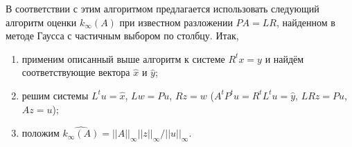 В соответствии с этим алгоритмом предлагается использовать следующий алгоритм оценки $k_{\infty}(A)$ при известном разложении $PA=LR$, найденном в методе Гаусса с частичным выбором по столбцу. Итак,
\begin{enumerate}
	\item применим описанный выше алгоритм к системе $R^{t}x=y$ и найдём соответствующие вектора $\hat{x}$ и $\hat{y}$;
	\item решим системы $L^{t}u=\hat{x}$, $Lw=Pu$, $Rz=w$ ($A^{t}P^{t}u=R^{t}L^{t}u = \hat{y}$, $LRz=Pu$, $Az=u$);
	\item положим $\hat{ k_{\infty} (A) } = ||A||_{\infty} ||z||_{\infty} / ||u||_{\infty}$.
\end{enumerate}



